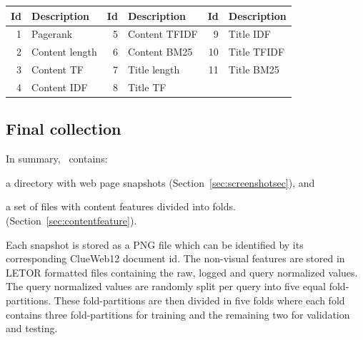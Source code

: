 \begin{table}[h]
\centering
{}  \label{tab:setdescription} 
\begin{tabular}{rlrlrl}
\toprule
Id & Description & Id & Description & Id & Description    \\ 
\midrule
1  & Pagerank  & 5  & Content TFIDF  & 9  & Title IDF   \\
2  & Content length & 6  & Content BM25   & 10 & Title TFIDF   \\
3  & Content TF  & 7  & Title length & 11 & Title BM25  \\
4  & Content IDF & 8  & Title TF  & & \\
\bottomrule
\end{tabular}
\end{table}





\subsection{Final collection}\label{sec:finalcollection}
In summary, \datasetname~contains:
\begin{inparaenum}[(i)]
\item a directory with web page snapshots (Section~\ref{sec:screenshotsec}), and
\item a set of files with content features divided into folds. (Section~\ref{sec:contentfeature}).
\end{inparaenum}
Each snapshot is stored as a PNG file which can be identified by its corresponding ClueWeb12 document id. 
The non-visual features are stored in LETOR formatted files containing the raw, logged and query normalized values.
The query normalized values are randomly split per query into five equal fold-partitions.
These fold-partitions are then divided in five folds where each fold contains three fold-partitions for training and the remaining two for validation and testing.


